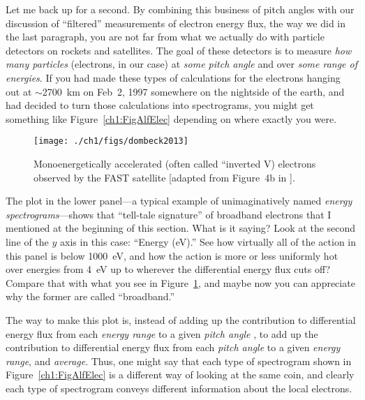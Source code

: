 Let me back up for a second. By combining this business of pitch
angles with our discussion of ``filtered'' measurements of electron
energy flux, the way we did in the last paragraph, you are not far
from what we actually do with particle detectors on rockets and
satellites. The goal of these detectors is to measure \emph{how many
  particles} (electrons, in our case) at \emph{some pitch angle} and
over \emph{some range of energies}. If you had made these types of
calculations for the electrons hanging out at $\sim$2700~km on Feb~2,
1997 somewhere on the nightside of the earth, and had decided to turn
those calculations into spectrograms, you might get something like
Figure~\ref{ch1:FigAlfElec} depending on where exactly you were.


\begin{figure}
  \centering
  \noindent\texttt{[image: ./ch1/figs/dombeck2013]}
  \caption[Inverted V (monoenergetic) electrons]{Monoenergetically
    accelerated (often called ``inverted V) electrons observed by
    the FAST satellite [adapted from Figure~4b in \citet{Dombeck2013}].}
  \label{ch1:FigDombeck}
\end{figure}


The plot in the lower panel---a typical example of unimaginatively
named \emph{energy spectrograms}---shows that ``tell-tale signature''
of broadband electrons that I mentioned at the beginning of this
section. What is it saying? Look at the second line of the $y$ axis in
this case: ``Energy (eV).'' See how virtually all of the action in
this panel is below 1000~eV, and how the action is more or less
uniformly hot over energies from 4~eV up to wherever the differential
energy flux cuts off? Compare that with what you see in
Figure~\ref{ch1:FigDombeck}, and maybe now you can appreciate why the
former are called ``broadband.'' 

The way to make this plot is, instead of adding up the contribution to
differential energy flux from each \emph{energy range} to a given
\emph{pitch angle} , to add up the contribution to differential energy
flux from each \emph{pitch angle} to a given \emph{energy range}, and
\emph{average}. Thus, one might say that each type of spectrogram
shown in Figure~\ref{ch1:FigAlfElec} is a different way of looking at
the same coin, and clearly each type of spectrogram conveys different
information about the local electrons.

